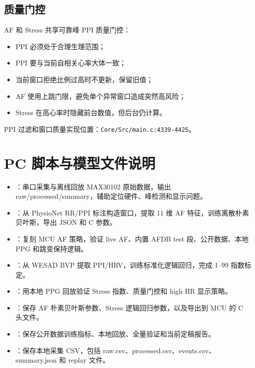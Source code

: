 \documentclass[10.5pt,a4paper,UTF8]{ctexart}
\begin{document}
\subsection{质量门控}

AF 和 Stress 共享可靠峰 PPI 质量门控：

\begin{itemize}
  \item PPI 必须处于合理生理范围；
  \item PPI 要与当前自相关心率大体一致；
  \item 当前窗口拒绝比例过高时不更新，保留旧值；
  \item AF 使用上跳门限，避免单个异常窗口造成突然高风险；
  \item Stress 在高心率时隐藏前台数值，但后台仍计算。
\end{itemize}

PPI 过滤和窗口质量实现位置：\texttt{Core/Src/main.c:4339-4425}。

\section{PC 脚本与模型文件说明}

\begin{itemize}
  \item {}：串口采集与离线回放 MAX30102 原始数据，输出 raw/processed/summary，辅助定位硬件、峰检测和显示问题。
  \item {}：从 PhysioNet RR/PPI 标注构造窗口，提取 11 维 AF 特征，训练离散朴素贝叶斯，导出 JSON 和 C 参数。
  \item {}：复刻 MCU AF 策略，验证 live AF、内置 AFDB test 段、公开数据、本地 PPG 和跳变保持逻辑。
  \item {}：从 WESAD BVP 提取 PPI/HRV，训练标准化逻辑回归，完成 1--99 指数标定。
  \item {}：用本地 PPG 回放验证 Stress 指数、质量门控和 high HR 显示策略。
  \item {}：保存 AF 朴素贝叶斯参数、Stress 逻辑回归参数，以及导出到 MCU 的 C 头文件。
  \item {}：保存公开数据训练指标、本地回放、全量验证和当前定稿报告。
  \item {}：保存本地采集 CSV，包括 raw.csv、processed.csv、events.csv、summary.json 和 replay 文件。
\end{itemize}
\end{document}
